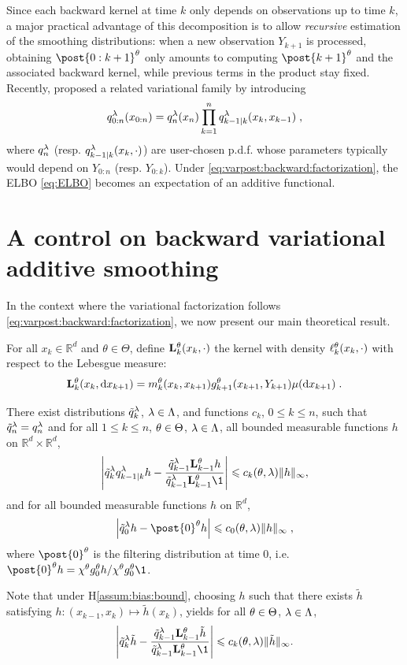 \documentclass{article}
\begin{document}
Since each backward kernel at time $k$ only depends on observations up to time $k$, a major practical advantage of this decomposition is to allow \textit{recursive} estimation of the smoothing distributions: when a new observation $Y_{k+1}$ is processed, obtaining $\post{0:k+1}^{\parvec}$ only amounts to computing $\post{k+1}^{\parvec}$ and the associated backward kernel, while previous terms in the product stay fixed. 
Recently, \cite{campbell2021online} proposed  a related variational family by introducing
\begin{equation}
    \label{eq:varpost:backward:factorization}
 q_{0:n}^{\lambda}(x_{0:n})=  q_{n}^{\lambda}(x_n)\prod_{k=1}^{n}q_{k-1\vert k}^{\lambda}(x_{k},x_{k - 1})\;,
\end{equation}
where $q_{n}^{\lambda}$ (resp. $q_{k - 1\vert k}^{\lambda}(x_{k},\cdot)$) are user-chosen p.d.f. whose parameters typically would depend on $Y_{0:n}$ (resp. $Y_{0:k}$). Under \eqref{eq:varpost:backward:factorization}, the ELBO \eqref{eq:ELBO} becomes an expectation of an additive functional.


\section{A control on backward variational additive smoothing}
\label{sec:theoretical_result}
In the context where the variational factorization follows \ref{eq:varpost:backward:factorization}, we now present our main theoretical result. 

For all $x_k\in\mathbb{R}^d$ and $\theta\in\Theta$, define $\mathbf{L}_{k}^{\theta}(x_k, \cdot)$ the kernel with density $\ell_{k}^{\theta}(x_{k},\cdot) $ with respect to the Lebesgue measure:
$$
\mathbf{L}_{k}^{\theta}(x_k, \mathrm{d} x_{k+ 1})  = m_{k}^{\theta}(x_{k}, x_{k+1})g_{k+1}^{\theta}(x_{k+1},Y_{k+1})\mu(\mathrm{d} x_{k+1})\;.
$$
\begin{hypH}
\label{assum:bias:bound}
There exist distributions $\tilde{q}_{k}^{\lambda}$, $\lambda\in\Lambda$, and  functions $c_k$, $0\leqslant k \leqslant n$, such that $\tilde{q}_{n}^{\lambda}=q_{n}^{\lambda}$ and for all $1\leqslant k \leqslant n$, $\theta\in\Theta$, $\lambda\in\Lambda$, all bounded measurable functions $h$ on $\mathbb{R}^d\times\mathbb{R}^d$, 
$$
\left|\ivd{k}\vd{k-1 \vert k} h - \frac{\ivd{k-1} \uk{k-1}{\parvec}h}{\ivd{k-1} \uk{k-1}{\parvec}\1}\right| \leqslant c_k(\parvec,\parvar) \| h \|_\infty,
$$ 
and for all bounded measurable functions $h$ on $\mathbb{R}^d$,
$$
\left|\ivd{0} h - \post{0}^{\parvec}h \right|\leqslant c_0(\parvec,\parvar)\|h\|_\infty\eqsp,
$$
where  $\post{0}^{\parvec}$ is the filtering distribution at time $0$, i.e. $\post{0}^{\parvec}h = \chi^\parvec \md{0}{\parvec}h/\chi^\parvec \md{0}{\parvec}\1$.
\end{hypH}
Note that under H\ref{assum:bias:bound}, choosing $h$ such that there exists $\tilde h$ satisfying  $h:(x_{k-1},x_k) \mapsto \tilde h (x_k)$, yields for all $\theta\in\Theta$, $\lambda\in\Lambda$, 
$$
\left|\ivd{k} \tilde h - \frac{\ivd{k-1} \uk{k-1}{\parvec} \tilde h}{\ivd{k-1} \uk{k-1}{\parvec}\1}\right| \leqslant c_k(\parvec,\parvar) \| \tilde h \|_\infty.
$$ 
\end{document}
